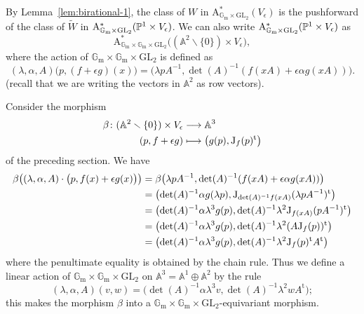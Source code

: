 \documentclass{amsart}
\numberwithin{equation}{section}
\numberwithin{subsection}{section}
\theoremstyle{definition}
\theoremstyle{remark}
\renewcommand\AA{\mathbb{A}} \newcommand\BB{\mathbb{B}}
\newcommand\rA{\mathrm{A}} \newcommand\rB{\mathrm{B}}
\renewcommand{\setminus}{\smallsetminus}
\newcommand{\GL}{\mathrm{GL}}
\newcommand{\gm}{\mathbb{G}_{\mathrm{m}}}
\newcommand{\trans}{^{\mathrm{t}}}
\newcommand\Ve{V_{\epsilon}}
\begin{document}
By Lemma~\ref{lem:birational-1}, the class of $W$ in $\rA^*_{\gm \times \GL_{2}}(\Ve)$ is the pushforward of the class of $\widetilde{W}$ in $\rA^*_{\gm \times \GL_{2}}(\PP^{1}\times\Ve)$. We can also write $\rA^*_{\gm \times \GL_{2}}(\PP^{1}\times\Ve)$ as
   \[
   \rA^*_{\gm \times\gm \times \GL_{2}}
   \bigl((\AA^{2}\setminus\{0\})\times\Ve\bigr),
   \]
where the action of $\gm \times\gm \times \GL_{2}$ is defined as
   \[
   (\lambda, \alpha, A)\bigl(p, (f+\epsilon g)(x)\bigr)
   = \bigl(\lambda pA^{-1},
      \det(A)^{-1}(f(xA) + \epsilon \alpha g(xA))\bigr).
   \]
(recall that we are writing the vectors in $\AA^{2}$ as row vectors). 

Consider the morphism
   \begin{align*}
   \beta\colon (\AA^2 \setminus \{0\}) \times \Ve &\longrightarrow \AA^3\\
   (p, f + \epsilon g) & \longmapsto 
   \bigl(g(p), \rJ_{f}(p)\trans\bigr)
   \end{align*}
of the preceding section. We have
   \begin{alignat*}{3}
   \beta\bigl((\lambda,\alpha,A)\cdot\bigl(p,f(x)+\epsilon g(x)\bigr)\bigr) &=
   \beta\bigl(\lambda pA^{-1},\det(A)^{-1}(f(xA)
      + \epsilon \alpha g(xA))\bigr)\\
   &=\bigl(\det(A)^{-1}\alpha g(\lambda p),
      \rJ_{\det(A)^{-1}f(xA)}(\lambda pA^{-1})\trans\bigr)\\
   &=\bigl(\det(A)^{-1}\alpha\lambda^{3} g(p),
      \det(A)^{-1}\lambda^{2}\rJ_{f(xA)}(pA^{-1})\trans\bigr)\\
   &=\bigl(\det(A)^{-1}\alpha\lambda^{3} g(p),
      \det(A)^{-1}\lambda^{2} (A\rJ_{f}(p))\trans\bigr)\\
   &=\bigl(\det(A)^{-1}\alpha\lambda^{3} g(p),
      \det(A)^{-1}\lambda^{2} \rJ_{f}(p)\trans A\trans\bigr) 
   \end{alignat*}
where the penultimate equality is obtained by the chain rule. Thus we define a linear  action of $\gm \times \gm \times \GL_{2}$ on $\AA^{3} = \AA^{1} \oplus \AA^{2}$ by the rule
   \[
   (\lambda, \alpha, A)(v, w) =
   \bigl(\det(A)^{-1}\alpha\lambda^{3} v,
      \det(A)^{-1}\lambda^{2} wA\trans\bigr);
   \]
this makes the morphism $\beta$ into a $\gm \times \gm \times \GL_{2}$-equivariant morphism.
\end{document}
